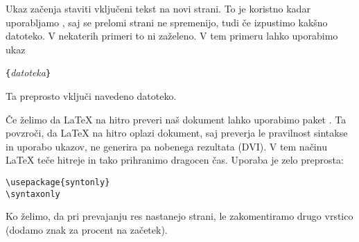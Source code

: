 Ukaz  začenja staviti vključeni tekst na novi strani. 
To je koristno kadar uporabljamo , saj se prelomi strani ne spremenijo, tudi če izpustimo kakšno
datoteko. V nekaterih primeri to ni zaželeno. V tem primeru lahko uporabimo ukaz 
\begin{lscommand}
\verb|{|\emph{datoteka}\verb|}|
\end{lscommand}
\noindent 
Ta preprosto vključi navedeno datoteko.

Če želimo da \LaTeX{} na hitro preveri naš dokument lahko uporabimo paket . 
Ta povzroči, da \LaTeX{} na hitro oplazi dokument, saj preverja le pravilnost sintakse 
in uporabo ukazov, ne generira pa nobenega rezultata (DVI).
V tem načinu \LaTeX{} teče hitreje in tako prihranimo dragocen čas.
Uporaba je zelo preprosta:

\begin{verbatim}
\usepackage{syntonly}
\syntaxonly
\end{verbatim}

Ko želimo, da pri prevajanju res nastanejo strani, le zakomentiramo drugo vrstico 
(dodamo znak za procent na začetek).



%

